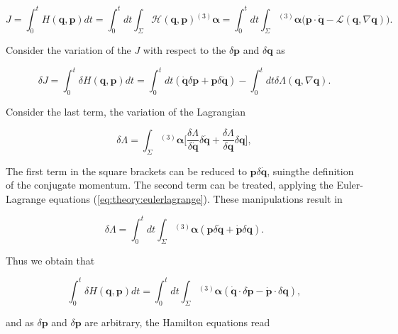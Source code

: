 \documentclass[11pt,a4paper,headinclude=true,DIV=14,BCOR=8mm,chapterprefix,listof=totoc,twoside,openright,abstracton]{scrbook}
\begin{document}
\begin{equation}
    J = \int_{0}^{t}H(\boldsymbol{q},\boldsymbol{p})dt = \int_{0}^{t}dt\int_{\Sigma}\mathcal{H}(\boldsymbol{q},\boldsymbol{p}){^{(3)}\boldsymbol{\alpha}} = \int_{0}^{t}dt\int_{\Sigma}{^{(3)}\boldsymbol{\alpha}}\Big(\boldsymbol{p}\cdot\dot{\boldsymbol{q}} - \mathcal{L}(\boldsymbol{q},\nabla\boldsymbol{q})\Big).
\end{equation}

Consider the variation of the $J$ with respect to the $\delta\boldsymbol{p}$ and $\delta\boldsymbol{q}$ as

\begin{equation}
    \delta J = \int_{0}^{t}\delta H(\boldsymbol{q},\boldsymbol{p})dt = \int_{0}^{t}dt (\dot{\boldsymbol{q}}\delta\boldsymbol{p}+\boldsymbol{p}\delta\dot{\boldsymbol{q}}) - \int_{0}^{t}dt\delta\Lambda(\boldsymbol{q}, \nabla\boldsymbol{q}).
\end{equation}

Consider the last term, the variation of the Lagrangian 

\begin{equation}
    \delta\Lambda = \int_{\Sigma}{^{(3)}\boldsymbol{\alpha}}\Bigg[\frac{\delta\Lambda}{\delta\dot{\boldsymbol{q}}}\delta\dot{\boldsymbol{q}}+\frac{\delta\Lambda}{\delta\boldsymbol{q}}\delta\boldsymbol{q}\Bigg],
\end{equation}

The first term in the square brackets can be reduced to $\boldsymbol{p}\delta\dot{\boldsymbol{q}}$, suingthe definition of the conjugate momentum. The second term can be treated, applying the Euler-Lagrange equations (\ref{eq:theory:eulerlagrange}). These manipulations result in

\begin{equation}
    \delta\Lambda = \int_{0}^{t}dt\int_{\Sigma}{^{(3)}\boldsymbol{\alpha}}(\boldsymbol{p}\delta\dot{\boldsymbol{q}} + \dot{\boldsymbol{p}}\delta\boldsymbol{q}).
\end{equation}

Thus we obtain that 

\begin{equation}
    \int_{0}^{t} \delta H(\boldsymbol{q},\boldsymbol{p})dt =   \int_{0}^{t}dt\int_{\Sigma}{^{(3)}\boldsymbol{\alpha}}(\dot{\boldsymbol{q}}\cdot\delta\boldsymbol{p}-\dot{\boldsymbol{p}}\cdot\delta\boldsymbol{q}),
\end{equation}

and as $\delta\boldsymbol{p}$ and $\delta\boldsymbol{p}$ are arbitrary, the Hamilton equations read
\end{document}
